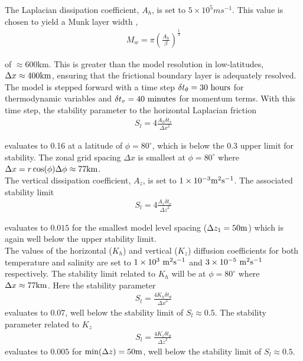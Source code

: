 The Laplacian dissipation coefficient, $A_{h}$, is set to $5 \times 10^5 m s^{-1}$.
This value is chosen to yield a Munk layer width \cite{adcroft:95},
\begin{eqnarray}
\label{EQ:eg-hs-munk_layer}
M_{w} = \pi ( \frac { A_{h} }{ \beta } )^{\frac{1}{3}}
\end{eqnarray}

\noindent  of $\approx 600$km. This is greater than the model
resolution in low-latitudes, $\Delta x \approx 400{\rm km}$, ensuring that the frictional 
boundary layer is adequately resolved.
\\

\noindent The model is stepped forward with a 
time step $\delta t_{\theta}=30~{\rm hours}$ for thermodynamic variables and
$\delta t_{v}=40~{\rm minutes}$ for momentum terms. With this time step, the stability 
parameter to the horizontal Laplacian friction \cite{adcroft:95}
\begin{eqnarray}
\label{EQ:eg-hs-laplacian_stability}
S_{l} = 4 \frac{A_{h} \delta t_{v}}{{\Delta x}^2}
\end{eqnarray}

\noindent evaluates to 0.16 at a latitude of $\phi=80^{\circ}$, which is below the 
0.3 upper limit for stability. The zonal grid spacing $\Delta x$ is smallest at
$\phi=80^{\circ}$ where $\Delta x=r\cos(\phi)\Delta \phi\approx 77{\rm km}$.
\\

\noindent The vertical dissipation coefficient, $A_{z}$, is set to 
$1\times10^{-3} {\rm m}^2{\rm s}^{-1}$. The associated stability limit
\begin{eqnarray}
\label{EQ:eg-hs-laplacian_stability_z}
S_{l} = 4 \frac{A_{z} \delta t_{v}}{{\Delta z}^2}
\end{eqnarray}

\noindent evaluates to $0.015$ for the smallest model
level spacing ($\Delta z_{1}=50{\rm m}$) which is again well below
the upper stability limit.
\\

The values of the horizontal ($K_{h}$) and vertical ($K_{z}$) diffusion coefficients 
for both temperature and salinity are set to $1 \times 10^{3}~{\rm m}^{2}{\rm s}^{-1}$ 
and $3 \times 10^{-5}~{\rm m}^{2}{\rm s}^{-1}$ respectively. The stability limit 
related to $K_{h}$ will be at $\phi=80^{\circ}$ where $\Delta x \approx 77 {\rm km}$. 
Here the stability parameter 
\begin{eqnarray} 
\label{EQ:eg-hs-laplacian_stability_xtheta}
S_{l} = \frac{4 K_{h} \delta t_{\theta}}{{\Delta x}^2} 
\end{eqnarray}
evaluates to $0.07$, well below the stability limit of $S_{l} \approx 0.5$. The 
stability parameter related to $K_{z}$
\begin{eqnarray} 
\label{EQ:eg-hs-laplacian_stability_ztheta}
S_{l} = \frac{4 K_{z} \delta t_{\theta}}{{\Delta z}^2} 
\end{eqnarray}
evaluates to $0.005$ for $\min(\Delta z)=50{\rm m}$, well below the stability limit 
of $S_{l} \approx 0.5$.
\\

